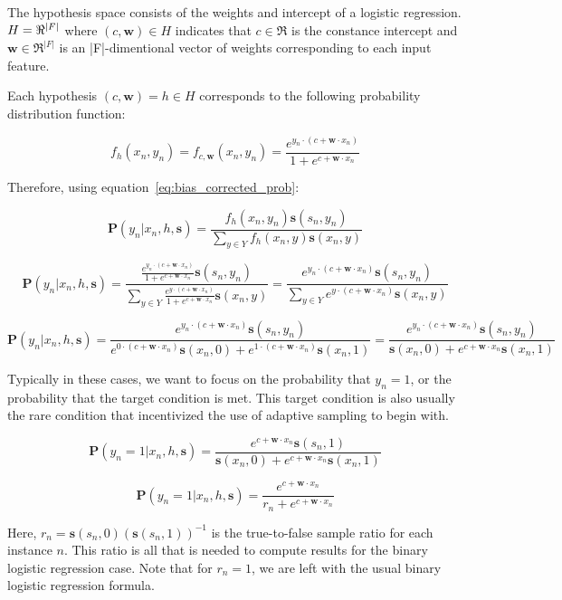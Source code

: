 \documentclass[twoside]{article}
\begin{document}
The hypothesis space consists of the weights and intercept of a logistic regression. \(H=\Re \time \Re ^{|F|}\)  where  \((c, \mathbf{w}) \in H\) indicates that \(c \in \Re\) is the constance intercept and \(\mathbf{w} \in \Re ^{|F|}\) is an |F|-dimentional vector of weights corresponding to each input feature.

Each hypothesis \((c, \mathbf{w})=h \in H\) corresponds to the following probability distribution function:

\[f_h(x_n, y_n)=f_{c,\mathbf{w}}(x_n, y_n)=\frac{e^{y_n \cdot (c+\mathbf{w} \cdot x_n)}}{1+e^{c+\mathbf{w} \cdot x_n}}\]

Therefore, using  equation~\eqref{eq:bias_corrected_prob}:

\[\mathbf{P}(y_n|x_n,h,\mathbf{s})=\frac{f_h(x_n,y_n)\mathbf{s}(s_n,y_n)}{\sum_{y \in Y}f_h(x_n,y)\mathbf{s}(x_n,y)} \]

\[\mathbf{P}(y_n|x_n,h,\mathbf{s})=\frac{\frac{e^{y_n \cdot(c+\mathbf{w} \cdot x_n)}}{1+e^{c+\mathbf{w} \cdot x_n}}\mathbf{s}(s_n,y_n)}{\sum_{y \in Y}\frac{e^{y \cdot (c+\mathbf{w} \cdot x_n)}}{1+e^{c+\mathbf{w} \cdot x_n}}\mathbf{s}(x_n,y)} =\frac{e^{y_n \cdot (c+\mathbf{w} \cdot x_n)}\mathbf{s}(s_n,y_n)}{\sum_{y \in Y}e^{y \cdot (c+\mathbf{w} \cdot x_n)}\mathbf{s}(x_n,y)}\]

\[\mathbf{P}(y_n|x_n,h,\mathbf{s})=\frac{e^{y_n \cdot (c+\mathbf{w} \cdot x_n)}\mathbf{s}(s_n,y_n)}{e^{0 \cdot (c+\mathbf{w} \cdot x_n)}\mathbf{s}(x_n,0)+e^{1 \cdot (c+\mathbf{w} \cdot x_n)}\mathbf{s}(x_n,1)}=\frac{e^{y_n \cdot (c+\mathbf{w} \cdot x_n)}\mathbf{s}(s_n,y_n)}{\mathbf{s}(x_n,0)+e^{c+\mathbf{w} \cdot x_n}\mathbf{s}(x_n,1)} \]

Typically in these cases, we want to focus on the probability that \(y_n = 1\), or the probability that the target condition is met. This target condition is also usually the rare condition that incentivized the use of adaptive sampling to begin with.

\[\mathbf{P}(y_n=1|x_n,h,\mathbf{s})=\frac{e^{c+\mathbf{w} \cdot x_n}\mathbf{s}(s_n,1)}{\mathbf{s}(x_n,0)+e^{c+\mathbf{w} \cdot x_n}\mathbf{s}(x_n,1)} \]

\[\mathbf{P}(y_n=1|x_n,h,\mathbf{s})=\frac{e^{c+\mathbf{w} \cdot x_n}}{r_n+e^{c+\mathbf{w} \cdot x_n}} \]

Here, \(r_n = \mathbf{s}(s_n,0)(\mathbf{s}(s_n,1))^{-1}\) is the true-to-false sample ratio for each instance \(n\). This ratio is all that is needed to compute results for the binary logistic regression case. Note that for \(r_n=1\), we are left with the usual binary logistic regression formula.
\end{document}
